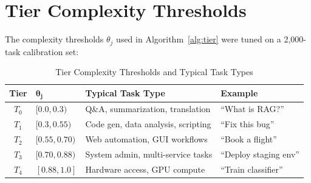 \section{Tier Complexity Thresholds}

\label{app:thresholds}

The complexity thresholds $\theta_j$ used in Algorithm~\ref{alg:tier} were
tuned on a 2,000-task calibration set:

\begin{table}[H]
\centering
\caption{Tier Complexity Thresholds and Typical Task Types}
\label{tab:thresholds}
\begin{tabular}{clll}
\toprule
\textbf{Tier} & $\bm{\theta_j}$ & \textbf{Typical Task Type} &
\textbf{Example} \\
\midrule
$T_0$ & $[0.0, 0.3)$ & Q\&A, summarization, translation &
    ``What is RAG?'' \\
$T_1$ & $[0.3, 0.55)$ & Code gen, data analysis, scripting &
    ``Fix this bug'' \\
$T_2$ & $[0.55, 0.70)$ & Web automation, GUI workflows &
    ``Book a flight'' \\
$T_3$ & $[0.70, 0.88)$ & System admin, multi-service tasks &
    ``Deploy staging env'' \\
$T_4$ & $[0.88, 1.0]$ & Hardware access, GPU compute &
    ``Train classifier'' \\
\bottomrule
\end{tabular}
\end{table}

